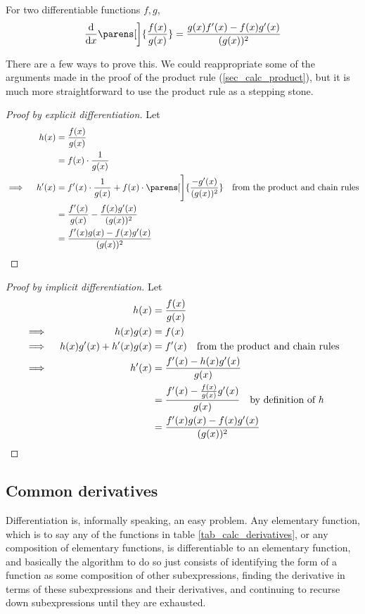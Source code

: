 \begin{theorem}
 For two differentiable functions \(f, g\),
 \begin{equation*}
  \dv{x}\parens[\bigg]{\frac{f(x)}{g(x)}} = \frac{g(x)f'(x) - f(x)g'(x)}{(g(x))^2}
 \end{equation*}
\end{theorem}
There are a few ways to prove this. We could reappropriate some of the arguments
made in the proof of the product rule (\ref{sec_calc_product}), but it is much
more straightforward to use the product rule as a stepping stone.
\begin{proof}[Proof by explicit differentiation]
 Let
 \begin{alignat*}{2}
  && h(x) &= \frac{f(x)}{g(x)} \\
  &&      &= f(x) \cdot \frac 1{g(x)} \\
  \implies{}&& h'(x)
          &= f'(x) \cdot \frac 1{g(x)}
              + f(x) \cdot \parens[\Bigg]{\frac{-g'(x)}{(g(x))^2}}
              \quad \text{from the product and chain rules} \\
  &&      &= \frac{f'(x)}{g(x)} - \frac{f(x)g'(x)}{(g(x))^2} \\
  &&      &= \frac{f'(x)g(x) - f(x)g'(x)}{(g(x))^2} \qedhere
 \end{alignat*}
\end{proof}
\begin{proof}[Proof by implicit differentiation]
 Let
 \begin{alignat*}{2}
  && h(x) &= \frac{f(x)}{g(x)} \\
  \implies{}&& h(x)g(x) &= f(x) \\
  \implies{}&& h(x)g'(x) + h'(x)g(x)
          &= f'(x) \quad \text{from the product and chain rules} \\
  \implies{}&& h'(x)
          &= \frac{f'(x) - h(x)g'(x)}{g(x)} \\
  &&      &= \frac{f'(x) - \frac{f(x)}{g(x)}g'(x)}{g(x)}
              \quad \text{by definition of \(h\)} \\
  &&      &= \frac{f'(x)g(x) - f(x)g'(x)}{(g(x))^2} \qedhere
 \end{alignat*}
\end{proof}

\subsection{Common derivatives} \label{calc_common}

Differentiation is, informally speaking, an easy problem. Any elementary
function, which is to say any of the functions in table
\ref{tab_calc_derivatives}, or any composition of elementary functions, is
differentiable to an elementary function, and basically the algorithm to do
so just consists of identifying the form of a function as some composition
of other subexpressions, finding the derivative in terms of these
subexpressions and their derivatives, and continuing to recurse down
subexpressions until they are exhausted.

